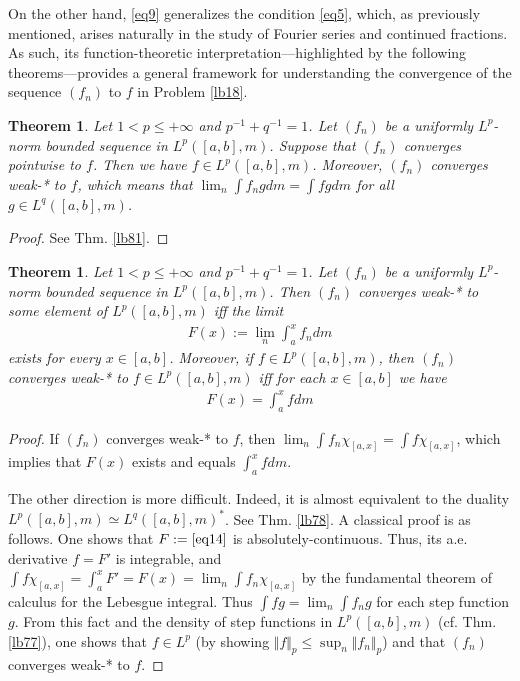 \documentclass[12pt,b5paper,notitlepage]{article}
\theoremstyle{definition}
\theoremstyle{plain}
\newtheorem{thm}[df]{Theorem}
\numberwithin{equation}{section}
\begin{document}
On the other hand, \eqref{eq9} generalizes the condition \eqref{eq5}, which, as previously mentioned, arises naturally in the study of Fourier series and continued fractions. As such, its function-theoretic interpretation---highlighted by the following theorems---provides a general framework for understanding the convergence of the sequence $(f_n)$ to $f$ in Problem \ref{lb18}. 


\begin{thm}\label{lb356}
Let $1<p\leq+\infty$ and $p^{-1}+q^{-1}=1$. Let $(f_n)$ be a uniformly $L^p$-norm bounded sequence in $L^p([a,b],m)$. Suppose that $(f_n)$ converges pointwise to $f$. Then we have $f\in L^p([a,b],m)$. Moreover,  $(f_n)$ converges weak-* to $f$, which means that $\lim_n\int f_ngdm=\int fgdm$ for all $g\in L^q([a,b],m)$.
\end{thm}

\begin{proof}
See Thm. \ref{lb81}.
\end{proof}




\begin{thm}\label{lb20}
Let $1<p\leq+\infty$ and $p^{-1}+q^{-1}=1$. Let $(f_n)$ be a uniformly $L^p$-norm bounded sequence in $L^p([a,b],m)$. Then $(f_n)$ converges weak-* to some element of $L^p([a,b],m)$  iff the limit
\begin{align}\label{eq14}
F(x):=\lim_n \int_a^x f_ndm
\end{align}
exists for every $x\in[a,b]$. Moreover, if $f\in L^p([a,b],m)$, then $(f_n)$ converges weak-* to $f\in L^p([a,b],m)$ iff for each $x\in[a,b]$ we have
\begin{align}\label{eq12}
F(x)=\int_a^x fdm
\end{align}
\end{thm}

\begin{proof}
If $(f_n)$ converges weak-* to $f$, then $\lim_n \int f_n\chi_{[a,x]}=\int f\chi_{[a,x]}$, which implies that $F(x)$ exists and equals $\int_a^x fdm$. 

The other direction is more difficult. Indeed, it is almost equivalent to the duality $L^p([a,b],m)\simeq L^q([a,b],m)^*$. See Thm. \ref{lb78}. A classical proof is as follows. One shows that $F:=\eqref{eq14}$ is absolutely-continuous. Thus, its a.e. derivative $f=F'$ is integrable, and $\int f\chi_{[a,x]}=\int_a^x F'=F(x)=\lim_n \int f_n\chi_{[a,x]}$ by the fundamental theorem of calculus for the Lebesgue integral. Thus $\int fg=\lim_n \int f_ng$ for each step function $g$. From this fact and the density of step functions in $L^p([a,b],m)$ (cf. Thm. \ref{lb77}), one shows that $f\in L^p$ (by showing $\Vert f\Vert_p\leq\sup_n\Vert f_n\Vert_p$) and that $(f_n)$ converges weak-* to $f$.
\end{proof}
\end{document}
